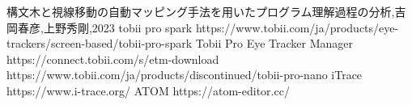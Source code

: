 \documentclass[paper=a4paper,fontsize=10pt]{jlreq}
\begin{document}
\begin{thebibliography}{99}
   構文木と視線移動の自動マッピング手法を用いたプログラム理解過程の分析,吉岡春彦,上野秀剛,2023
   tobii pro spark https://www.tobii.com/ja/products/eye-trackers/screen-based/tobii-pro-spark
   Tobii Pro Eye Tracker Manager https://connect.tobii.com/s/etm-download
   https://www.tobii.com/ja/products/discontinued/tobii-pro-nano
   iTrace https://www.i-trace.org/
   ATOM https://atom-editor.cc/
\end{thebibliography}
\end{document}
